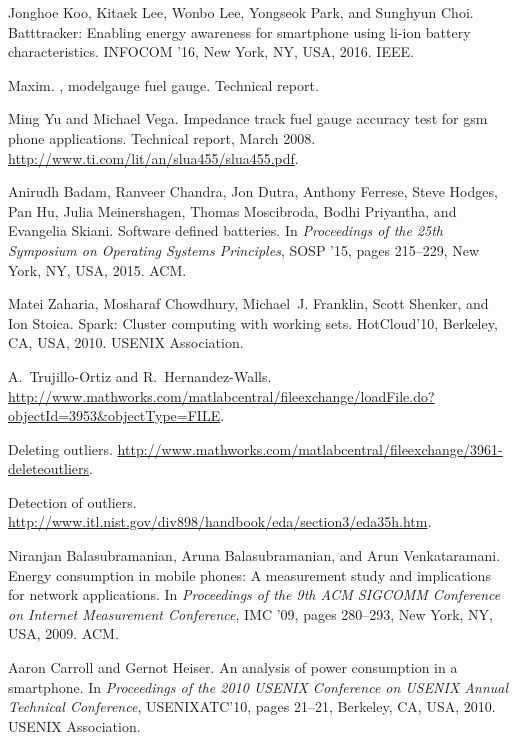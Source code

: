 \documentclass[journal]{IEEEtran}
\begin{document}
\begin{thebibliography}{10}
Jonghoe Koo, Kitaek Lee, Wonbo Lee, Yongseok Park, and Sunghyun Choi.
\newblock Batttracker: Enabling energy awareness for smartphone using li-ion
  battery characteristics.
\newblock INFOCOM '16, New York, NY, USA, 2016. IEEE.

Maxim.
, modelgauge fuel gauge.
\newblock Technical report.

Ming Yu and Michael Vega.
\newblock Impedance track fuel gauge accuracy test for gsm phone applications.
\newblock Technical report, March 2008.
\newblock \url{http://www.ti.com/lit/an/slua455/slua455.pdf}.

Anirudh Badam, Ranveer Chandra, Jon Dutra, Anthony Ferrese, Steve Hodges, Pan
  Hu, Julia Meinershagen, Thomas Moscibroda, Bodhi Priyantha, and Evangelia
  Skiani.
\newblock Software defined batteries.
\newblock In {\em Proceedings of the 25th Symposium on Operating Systems
  Principles}, SOSP '15, pages 215--229, New York, NY, USA, 2015. ACM.

Matei Zaharia, Mosharaf Chowdhury, Michael~J. Franklin, Scott Shenker, and Ion
  Stoica.
\newblock Spark: Cluster computing with working sets.
\newblock HotCloud'10, Berkeley, CA, USA, 2010. USENIX Association.

A.~Trujillo-Ortiz and R.~Hernandez-Walls.
\newblock
  \url{http://www.mathworks.com/matlabcentral/fileexchange/loadFile.do?objectId=3953&objectType=FILE}.

Deleting outliers.
\newblock
  \url{http://www.mathworks.com/matlabcentral/fileexchange/3961-deleteoutliers}.

Detection of outliers.
\newblock
  \url{http://www.itl.nist.gov/div898/handbook/eda/section3/eda35h.htm}.

Niranjan Balasubramanian, Aruna Balasubramanian, and Arun Venkataramani.
\newblock Energy consumption in mobile phones: A measurement study and
  implications for network applications.
\newblock In {\em Proceedings of the 9th ACM SIGCOMM Conference on Internet
  Measurement Conference}, IMC '09, pages 280--293, New York, NY, USA, 2009.
  ACM.

Aaron Carroll and Gernot Heiser.
\newblock An analysis of power consumption in a smartphone.
\newblock In {\em Proceedings of the 2010 USENIX Conference on USENIX Annual
  Technical Conference}, USENIXATC'10, pages 21--21, Berkeley, CA, USA, 2010.
  USENIX Association.


\end{thebibliography}
\end{document}
